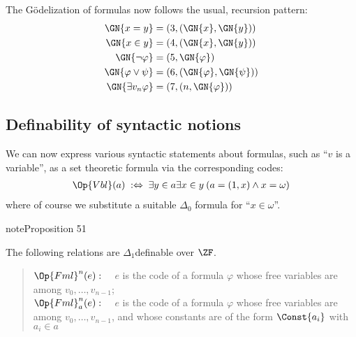 \documentclass[letterpaper,10pt,english]{jupyterBook}
\begin{document}
\sphinxAtStartPar
The Gödelization of formulas now follows the usual, recursion pattern:
\begin{align*}
\GN{x=y} & = (3, (\GN{x}, \GN{y})) \\
\GN{x\in y} & = (4, (\GN{x}, \GN{y})) \\
\GN{\neg \varphi} & = (5, \GN{\varphi}) \\
\GN{\varphi \vee \psi} & = (6, (\GN{\varphi}, \GN{\psi})) \\
\GN{\exists v_n \varphi} & = (7, (n, \GN{\varphi})) \\
\end{align*}

\subsection{Definability of syntactic notions}
\label{\detokenize{constructible:definability-of-syntactic-notions}}
\sphinxAtStartPar
We can now express various syntactic statements about formulas, such as “\(v\) is a variable”, as a set theoretic formula via the corresponding codes:
\begin{equation*}
\begin{split}
\Op{Vbl}(a) \; :\Leftrightarrow \; \exists y \in a \exists x \in y \: (a = (1,x) \wedge x = \omega)
\end{split}
\end{equation*}
\sphinxAtStartPar
where of course we substitute a suitable \(\Delta_0\) formula for “\(x \in \omega\)”.
\label{constructible:prop-defble-formula}
\begin{sphinxadmonition}{note}{Proposition 51}



\sphinxAtStartPar
The following relations are \(\Delta_1\)\sphinxhyphen{}definable over \(\ZF\).
\begin{quote}

\sphinxAtStartPar
\(\Op{Fml}^n(e): \quad\) \(e\) is the code of a formula \(\varphi\) whose free variables are among \(v_0, \dots, v_{n-1}\);\\
\(\Op{Fml}^n_a(e): \quad\) \(e\) is the code of a formula \(\varphi\) whose free variables are among \(v_0, \dots, v_{n-1}\), and whose constants are of the form \(\Const{a_i}\) with \(a_i \in a\)
\end{quote}
\end{sphinxadmonition}
\end{document}
